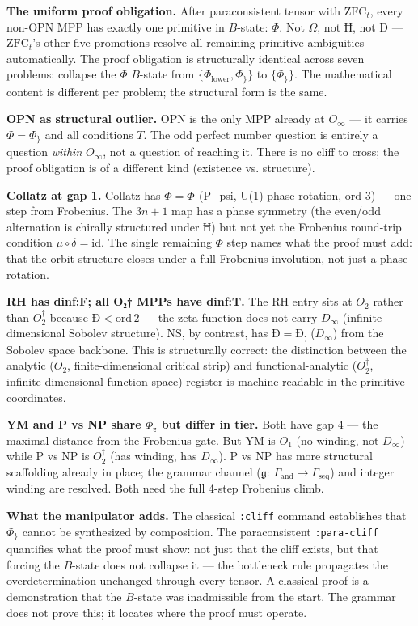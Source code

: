 \documentclass[12pt,a4paper]{article}
\begin{document}
\textbf{The uniform proof obligation.} After paraconsistent tensor with $\text{ZFC}_t$, every non-OPN MPP has exactly one primitive in $B$-state: $\Phi$. Not $\Omega$, not $\text{Ħ}$, not $\text{Ð}$ --- $\text{ZFC}_t$'s other five promotions resolve all remaining primitive ambiguities automatically. The proof obligation is structurally identical across seven problems: collapse the $\Phi$ $B$-state from $\{\Phi_\text{lower}, \Phi_\}\}$ to $\{\Phi_\}\}$. The mathematical content is different per problem; the structural form is the same.

\textbf{OPN as structural outlier.} OPN is the only MPP already at $O_{\infty}$ --- it carries $\Phi = \Phi_\}$ and all conditions $T$. The odd perfect number question is entirely a question \emph{within} $O_{\infty}$, not a question of reaching it. There is no cliff to cross; the proof obligation is of a different kind (existence vs. structure).

\textbf{Collatz at gap 1.} Collatz has $\Phi = \Phi_\dot{}$ (P\_psi, U(1) phase rotation, ord 3) --- one step from Frobenius. The $3n+1$ map has a phase symmetry (the even/odd alternation is chirally structured under $\text{Ħ}$) but not yet the Frobenius round-trip condition $\mu \circ \delta = \text{id}$. The single remaining $\Phi$ step names what the proof must add: that the orbit structure closes under a full Frobenius involution, not just a phase rotation.

\textbf{RH has dinf:F; all O₂† MPPs have dinf:T.} The RH entry sits at $O_2$ rather than $O_2^\dagger$ because $\text{Ð} < \text{ord}\, 2$ --- the zeta function does not carry $D_{\infty}$ (infinite-dimensional Sobolev structure). NS, by contrast, has $\text{Ð} = \text{Ð}_;$ ($D_{\infty}$) from the Sobolev space backbone. This is structurally correct: the distinction between the analytic ($O_2$, finite-dimensional critical strip) and functional-analytic ($O_2^\dagger$, infinite-dimensional function space) register is machine-readable in the primitive coordinates.

\textbf{YM and P vs NP share $\Phi_\text{ɐ}$ but differ in tier.} Both have gap 4 --- the maximal distance from the Frobenius gate. But YM is $O_1$ (no winding, not $D_{\infty}$) while P vs NP is $O_2^\dagger$ (has winding, has $D_{\infty}$). P vs NP has more structural scaffolding already in place; the grammar channel ($\mathfrak{g}$: $\Gamma_\text{and} \to \Gamma_\text{seq}$) and integer winding are resolved. Both need the full 4-step Frobenius climb.

\textbf{What the manipulator adds.} The classical \texttt{:cliff} command establishes that $\Phi_\}$ cannot be synthesized by composition. The paraconsistent \texttt{:para-cliff} quantifies what the proof must show: not just that the cliff exists, but that forcing the $B$-state does not collapse it --- the bottleneck rule propagates the overdetermination unchanged through every tensor. A classical proof is a demonstration that the $B$-state was inadmissible from the start. The grammar does not prove this; it locates where the proof must operate.
\end{document}
